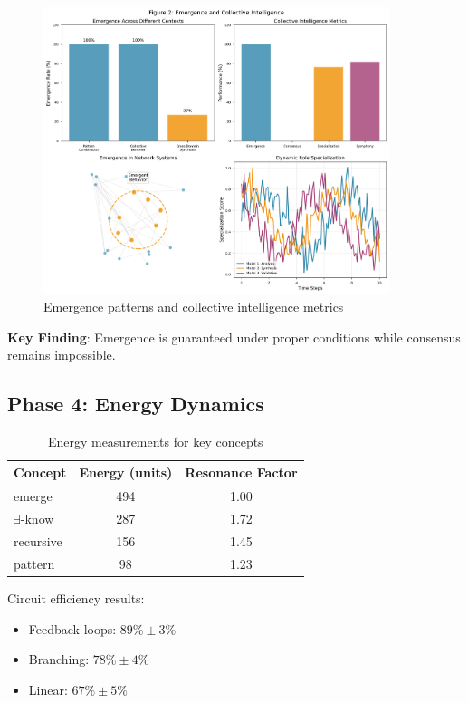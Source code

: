 \documentclass[11pt,a4paper]{article}
\begin{document}
\begin{figure}[H]
\centering
\includegraphics[width=0.9\textwidth]{paper_figure_2_emergence.png}
\caption{Emergence patterns and collective intelligence metrics}
\end{figure}

\textbf{Key Finding}: Emergence is guaranteed under proper conditions while consensus remains impossible.

\subsection{Phase 4: Energy Dynamics}

\begin{table}[H]
\centering
\caption{Energy measurements for key concepts}
\begin{tabular}{@{}lcc@{}}
\toprule
Concept & Energy (units) & Resonance Factor \\
\midrule
emerge & 494 & 1.00 \\
$\exists$-know & 287 & 1.72 \\
recursive & 156 & 1.45 \\
pattern & 98 & 1.23 \\
\bottomrule
\end{tabular}
\end{table}

Circuit efficiency results:
\begin{itemize}
    \item Feedback loops: $89\% \pm 3\%$
    \item Branching: $78\% \pm 4\%$
    \item Linear: $67\% \pm 5\%$
\end{itemize}
\end{document}
